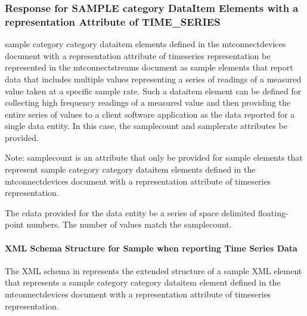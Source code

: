 \documentclass{mtconnect}	%
\begin{document}
\subsubsection{Response for SAMPLE category DataItem Elements with a representation Attribute of TIME\_SERIES}
\label{sec:Response for SAMPLE category DataItem Elements with a representation Attribute of TIME_SERIES}

\gls{sample category} category \gls{dataitem} elements defined in the \gls{mtconnectdevices} document with a \gls{representation} attribute of \gls{timeseries representation} \must be represented in the \gls{mtconnectstreams} document as \gls{sample} elements that report data that includes multiple values representing a series of readings of a measured value taken at a specific sample rate.   Such a \gls{dataitem} element can be defined for collecting high frequency readings of a measured value and then providing the entire series of values to a client software application as the data reported for a single \gls{data entity}.  In this case, the \gls{samplecount} and \gls{samplerate} attributes \must be provided. 

\begin{note}
Note: \gls{samplecount} is an attribute that \must only be provided for \gls{sample} elements that represent \gls{sample category} category \gls{dataitem} elements defined in the \gls{mtconnectdevices} document with a \gls{representation} attribute of \gls{timeseries representation}.  

\end{note}

The \gls{cdata} provided for the \gls{data entity} \must be a series of space delimited floating-point numbers.  The number of values \must match the \gls{samplecount}.  

\paragraph{XML Schema Structure for Sample when reporting Time Series Data}\mbox{}

The XML schema in   represents the extended structure of a \gls{sample} XML element that represents a \gls{sample category} category \gls{dataitem} element defined in the \gls{mtconnectdevices} document with a \gls{representation} attribute of \gls{timeseries representation}. 
\end{document}
